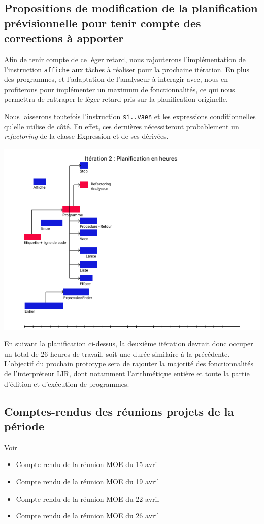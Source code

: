 \documentclass[12pt,a4paper,titlepage,openany, oneside]{report}
\begin{document}
    \subsection{Propositions de modification de la planification prévisionnelle pour tenir compte des corrections à apporter}
        Afin de tenir compte de ce léger retard, nous rajouterons l'implémentation de
        l'instruction \verb|affiche| aux tâches à réaliser pour la prochaine itération.
        En plus des programmes, et l'adaptation de l'analyseur à interagir avec, nous en
        profiterons pour implémenter un maximum de fonctionnalités, ce qui nous permettra
        de rattraper le léger retard pris sur la planification originelle.

        Nous laisserons toutefois l'instruction \verb|si..vaen| et les expressions
        conditionnelles qu'elle utilise de côté. En effet, ces dernières nécessiteront
        probablement un \emph{refactoring} de la classe Expression et de ses dérivées.

        \includegraphics[scale=0.75]{fichiers/planification/iteration2/iteration2Planif.png}

        En suivant la planification ci-dessus, la deuxième itération devrait donc occuper
        un total de 26 heures de travail, soit une durée similaire à la précédente.
        L'objectif du prochain prototype sera de rajouter la majorité des fonctionnalités
        de l'interpréteur LIR, dont notamment l'arithmétique entière et toute la partie
        d'édition et d'exécution de programmes.

    \subsection{Comptes-rendus des réunions projets de la période}
       Voir
       \begin{itemize}
           \item Compte rendu de la réunion MOE du 15 avril
           \item Compte rendu de la réunion MOE du 19 avril
           \item Compte rendu de la réunion MOE du 22 avril
           \item Compte rendu de la réunion MOE du 26 avril
       \end{itemize}
\end{document}
